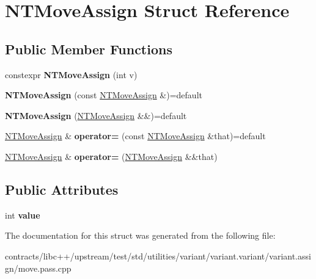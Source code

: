 \hypertarget{struct_n_t_move_assign}{}\section{N\+T\+Move\+Assign Struct Reference}
\label{struct_n_t_move_assign}
\subsection*{Public Member Functions}
\begin{DoxyCompactItemize}
\item 
\mbox{\label{struct_n_t_move_assign_a2ef86a641352b5cd32768f4cf9da88b7}} 
constexpr {\bfseries N\+T\+Move\+Assign} (int v)
\item 
\mbox{\label{struct_n_t_move_assign_a7b01ef0f591723ba1e416a4c3ac438e3}} 
{\bfseries N\+T\+Move\+Assign} (const \mbox{\hyperlink{struct_n_t_move_assign}{N\+T\+Move\+Assign}} \&)=default
\item 
\mbox{\label{struct_n_t_move_assign_a101a7e0bdeaba8efc94d7306a3443ac5}} 
{\bfseries N\+T\+Move\+Assign} (\mbox{\hyperlink{struct_n_t_move_assign}{N\+T\+Move\+Assign}} \&\&)=default
\item 
\mbox{\label{struct_n_t_move_assign_a21047a42108dc0946fac08cdaf67f103}} 
\mbox{\hyperlink{struct_n_t_move_assign}{N\+T\+Move\+Assign}} \& {\bfseries operator=} (const \mbox{\hyperlink{struct_n_t_move_assign}{N\+T\+Move\+Assign}} \&that)=default
\item 
\mbox{\label{struct_n_t_move_assign_ae6dac7509b40e994bd99ac4b5e739462}} 
\mbox{\hyperlink{struct_n_t_move_assign}{N\+T\+Move\+Assign}} \& {\bfseries operator=} (\mbox{\hyperlink{struct_n_t_move_assign}{N\+T\+Move\+Assign}} \&\&that)
\end{DoxyCompactItemize}
\subsection*{Public Attributes}
\begin{DoxyCompactItemize}
\item 
\mbox{\label{struct_n_t_move_assign_acb5a43c927b0818e98079106cba91ce2}} 
int {\bfseries value}
\end{DoxyCompactItemize}


The documentation for this struct was generated from the following file\+:\begin{DoxyCompactItemize}
\item 
contracts/libc++/upstream/test/std/utilities/variant/variant.\+variant/variant.\+assign/move.\+pass.\+cpp\end{DoxyCompactItemize}
